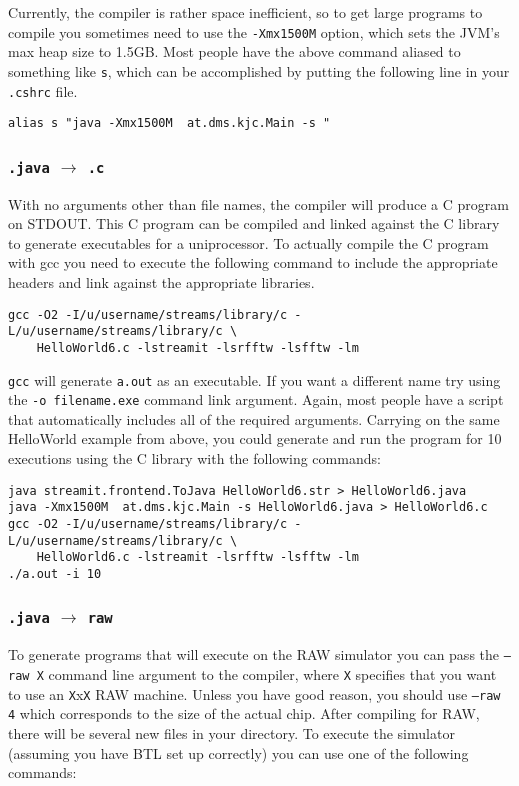 Currently, the compiler is rather space inefficient, so to get large 
programs to compile you sometimes need to use the {\tt -Xmx1500M} option,
which sets the JVM's max heap size to 1.5GB.
Most people have the above command aliased to something like {\tt s}, which
can be accomplished by putting the following line in your {\tt .cshrc} file.

\begin{verbatim}
alias s "java -Xmx1500M  at.dms.kjc.Main -s "
\end{verbatim}


\subsubsection{{\tt .java} $\rightarrow$ {\tt .c}}
With no arguments other than file names, the compiler will produce
a C program on STDOUT. This C program can be compiled 
and linked against the C library to generate executables for a 
uniprocessor. To actually compile the C program with gcc 
you need to execute the following command to include the appropriate
headers and link against the appropriate libraries.

\begin{verbatim}
gcc -O2 -I/u/username/streams/library/c -L/u/username/streams/library/c \
    HelloWorld6.c -lstreamit -lsrfftw -lsfftw -lm
\end{verbatim}

{\tt gcc} will generate {\tt a.out} as an executable. If you want a different
name try using the {\tt -o filename.exe} command link argument.
Again, most people have a script that
automatically includes all of the required arguments.
Carrying on the same HelloWorld example from above, you could generate
and run the program for 10 executions using the C library with the following
commands:

\begin{verbatim}
java streamit.frontend.ToJava HelloWorld6.str > HelloWorld6.java
java -Xmx1500M  at.dms.kjc.Main -s HelloWorld6.java > HelloWorld6.c
gcc -O2 -I/u/username/streams/library/c -L/u/username/streams/library/c \
    HelloWorld6.c -lstreamit -lsrfftw -lsfftw -lm
./a.out -i 10
\end{verbatim}


\subsubsection{{\tt .java} $\rightarrow$ {\tt raw}}
To generate programs that will execute on the RAW simulator
you can pass the {\tt --raw X} command line argument to the compiler,
where {\tt X} specifies that you want to use an {\tt X}x{\tt X}
RAW machine. Unless you
have good reason, you should use {\tt --raw 4} which
corresponds to the size of the actual chip. After compiling
for RAW, there will be several new files in your directory.
To execute the simulator (assuming you have BTL set up correctly)
you can use one of the following commands:

